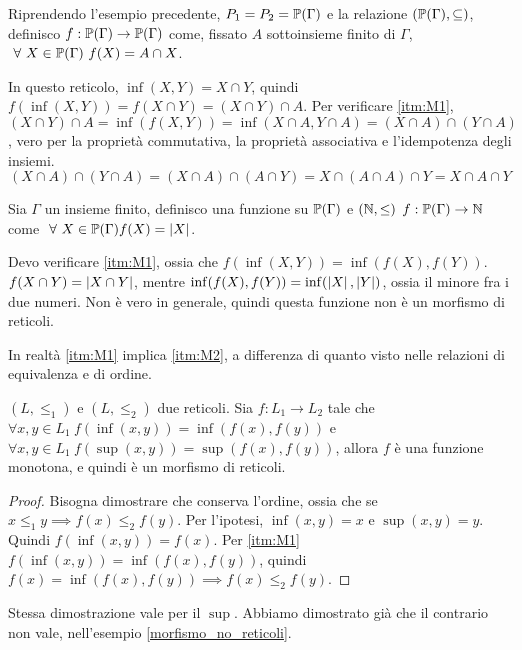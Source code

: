 \begin{exmp}
Riprendendo l'esempio precedente, $P_1 = P_2 = \mathbb{P}(\Gamma)$ e la relazione $(\mathbb{P}(\Gamma), \subseteq)$, definisco $f : \mathbb{P}(\Gamma) \to \mathbb{P}(\Gamma)$ come, fissato $A$ sottoinsieme finito di $\Gamma$, $\forall X \in \parts(\Gamma) \ f(X) = A \cap X$.

In questo reticolo, $\inf(X,Y) = X \cap Y$, quindi $f(\inf(X,Y)) = f(X \cap Y) = (X \cap Y) \cap A$. Per verificare \ref{itm:M1}, $(X \cap Y) \cap A = \inf(f(X,Y)) = \inf(X \cap A, Y \cap A) = (X \cap A) \cap (Y \cap A)$, vero per la propriet\`a commutativa, la propriet\`a associativa e l'idempotenza degli insiemi.
\[
(X \cap A) \cap (Y \cap A) = (X \cap A) \cap (A \cap Y) = X \cap (A \cap A) \cap Y = X \cap A \cap Y
\]
\end{exmp}

\begin{exmp}\label{morfismo_no_reticoli}
Sia $\Gamma$ un insieme finito, definisco una funzione su $\mathbb{P}(\Gamma)$ e $(\mathbb{N}, \le)$ $f : \mathbb{P}(\Gamma) \to \mathbb{N}$ come $\forall X \in \parts(\Gamma) f(X) = \abs{X}$.

Devo verificare \ref{itm:M1}, ossia che $f(\inf(X,Y)) = \inf(f(X),f(Y))$. $f(X \cap Y) = \left\lvert{X \cap Y}\right\rvert$, mentre $\inf(f(X),f(Y)) = \inf(\left\lvert{X}\right\rvert,\left\lvert{Y}\right\rvert)$, ossia il minore fra i due numeri. Non \`e vero in generale, quindi questa funzione non \`e un morfismo di reticoli.
\end{exmp}

In realt\`a \ref{itm:M1} implica \ref{itm:M2}, a differenza di quanto visto nelle relazioni di equivalenza e di ordine.

\begin{prop}
$(L, \le_1)$ e $(L, \le_2)$ due reticoli. Sia $f : L_1 \to L_2$ tale che $\forall x, y \in L_1 \ f(\inf(x,y)) = \inf (f(x),f(y))$ e $\forall x, y \in L_1 \ f(\sup(x,y)) = \sup (f(x),f(y))$, allora $f$ \`e una funzione monotona, e quindi \`e un morfismo di reticoli.
\end{prop}
\begin{proof}
Bisogna dimostrare che conserva l'ordine, ossia che se $x \le_1 y \implies f(x) \le_2 f(y)$. Per l'ipotesi, $\inf(x,y) = x$ e $\sup(x,y)= y$. Quindi $f(\inf(x,y)) = f(x)$. Per \ref{itm:M1} $f(\inf(x,y)) = \inf(f(x),f(y))$, quindi $f(x) = \inf(f(x),f(y)) \implies f(x) \le_2 f(y)$.
\end{proof}
Stessa dimostrazione vale per il $\sup$. Abbiamo dimostrato gi\`a che il contrario non vale, nell'esempio \ref{morfismo_no_reticoli}.

